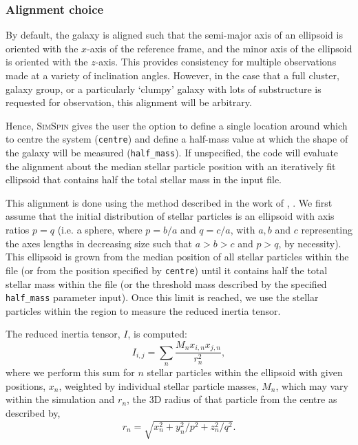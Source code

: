 \documentclass[
  journal=pasa,
  manuscript=research-paper, %
  year=2020,
  volume=37,
]{cup-journal}
\newcommand{\simspin}[1]{\textsc{SimSpin}#1} %
\begin{document}
\subsubsection{Alignment choice}
By default, the galaxy is aligned such that the semi-major axis of an ellipsoid is oriented with the $x$-axis of the reference frame, and the minor axis of the ellipsoid is oriented with the $z$-axis. 
This provides consistency for multiple observations made at a variety of inclination angles. 
However, in the case that a full cluster, galaxy group, or a particularly `clumpy' galaxy with lots of substructure is requested for observation, this alignment will be arbitrary. 

Hence, \simspin{} gives the user the option to define a single location around which to centre the system (\texttt{centre}) and define a half-mass value at which the shape of the galaxy will be measured (\texttt{half\_mass}). 
If unspecified, the code will evaluate the alignment about the median stellar particle position with an iteratively fit ellipsoid that contains half the total stellar mass in the input file. 

This alignment is done using the method described in the work of \citealt{Bassett2019GalaxyShapes},  \citep[which in turn is based on the work from][]{Li2018TheShapesIllustris, Allgood2006ShapeDarkMatterHaloes}. 
We first assume that the initial distribution of stellar particles is an ellipsoid with axis ratios $p = q$ (i.e. a sphere, where $p = b/a$ and $q = c/a$, with $a, b$ and $c$ representing the axes lengths in decreasing size such that $a > b > c$ and $p > q$, by necessity).  
This ellipsoid is grown from the median position of all stellar particles within the file (or from the position specified by \texttt{centre}) until it contains half the total stellar mass within the file (or the threshold mass described by the specified \texttt{half\_mass} parameter input). 
Once this limit is reached, we use the stellar particles within the region to measure the reduced inertia tensor. 

The reduced inertia tensor, $I$, is computed:
\begin{equation}
    I_{i,j} = \sum_n{\frac{M_n x_{i,n} x_{j,n}}{r^2_n}},
\end{equation}
where we perform this sum for $n$ stellar particles within the ellipsoid with given positions, $x_n$, weighted by individual stellar particle masses, $M_n$, which may vary within the simulation and $r_n$, the 3D radius of that particle from the centre as described by,  
\begin{equation}
r_n = \sqrt{x_n^2 + y_n^2 / p^2 + z_n^2 / q^2}.    
\end{equation}
\end{document}
